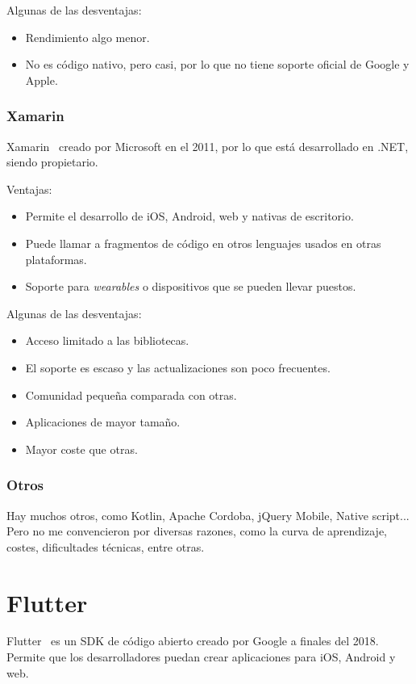 Algunas de las desventajas:
\begin{itemize}
	\item Rendimiento algo menor.
	\item No es código nativo, pero casi, por lo que no tiene soporte oficial de Google y Apple.
\end{itemize}

\subsubsection{Xamarin}
Xamarin~\cite{wiki:xamarin} creado por Microsoft en el 2011, por lo que está desarrollado en .NET, siendo propietario.

Ventajas:
\begin{itemize}
	\item Permite el desarrollo de iOS, Android, web y nativas de escritorio.
	\item Puede llamar a fragmentos de código en otros lenguajes usados en otras plataformas.
	\item Soporte para \emph{wearables} o dispositivos que se pueden llevar puestos.
\end{itemize}

Algunas de las desventajas:
\begin{itemize}
	\item Acceso limitado a las bibliotecas.
	\item El soporte es escaso y las actualizaciones son poco frecuentes.
	\item Comunidad pequeña comparada con otras.
	\item Aplicaciones de mayor tamaño.
	\item Mayor coste que otras.
\end{itemize}

\subsubsection{Otros}
Hay muchos otros, como Kotlin, Apache Cordoba, jQuery Mobile, Native script...
Pero no me convencieron por diversas razones, como la curva de aprendizaje, costes, dificultades técnicas, entre otras.
 
\section{Flutter}
Flutter~\cite{wiki:flutter} es un SDK de código abierto creado por Google a finales del 2018. Permite que los desarrolladores puedan crear aplicaciones para iOS, Android y web.


